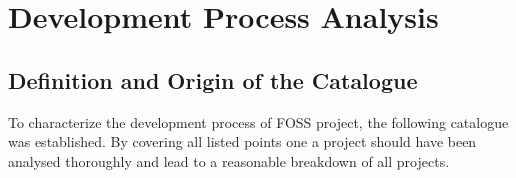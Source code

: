 \chapter{Development Process Analysis} %
\label{cha:Development Process Analysis}

\cleardoublepage


\cleardoublepage


\cleardoublepage


\cleardoublepage


\cleardoublepage


\cleardoublepage


\cleardoublepage
\section{Definition and Origin of the Catalogue} %
\label{sec:Definition and Origin of the Catalogue}

To characterize the development process of FOSS project, the following
catalogue was established. By covering all listed points one a project should
have been analysed thoroughly and lead to a reasonable breakdown of all
projects.

